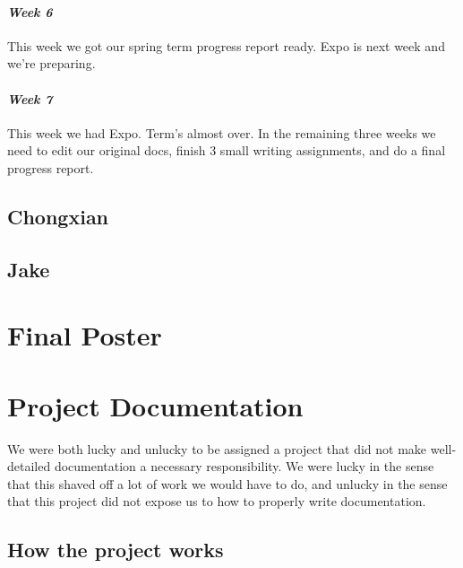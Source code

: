 \documentclass[onecolumn, draftclsnofoot,10pt, compsoc]{IEEEtran}
\begin{document}
\paragraph{\emph{Week 6}}
This week we got our spring term progress report ready. Expo is next week and we're preparing.
\paragraph{\emph{Week 7}}
This week we had Expo. Term's almost over. In the remaining three weeks we need to edit our original docs, finish 3 small writing assignments, and do a final progress report.
\subsection{Chongxian}

\subsection{Jake}

\section{Final Poster}

\section{Project Documentation}
We were both lucky and unlucky to be assigned a project that did not make well-detailed documentation a necessary responsibility. We were lucky in the sense that this shaved off a lot of work we would have to do, and unlucky in the sense that this project did not expose us to how to properly write documentation.
\subsection{How the project works}
\end{document}
